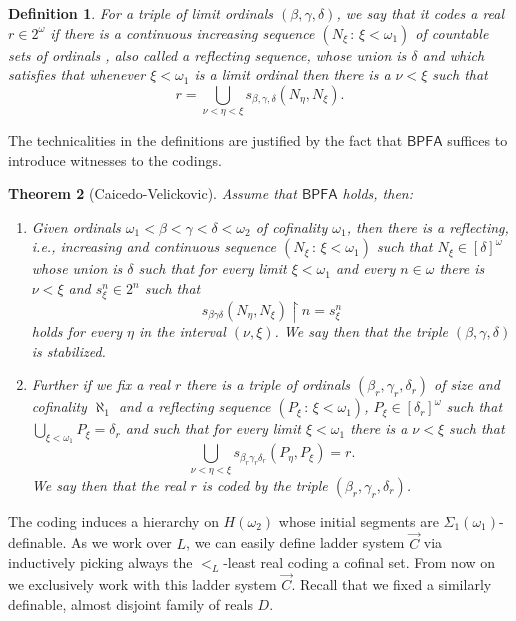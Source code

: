 \documentclass[a4paper,12pt]{article}
\newtheorem{theorem}{Theorem}[section]
\newtheorem{definition}[theorem]{Definition}
\newcommand{\BPFA}{\mathsf{BPFA}}
\begin{document}
\begin{definition}
For a triple of limit ordinals $(\beta, \gamma, \delta)$, we say that it codes a real $r \in 2^{\omega}$
if there is a continuous increasing sequence $(N_{\xi} \, : \, \xi < \omega_1)$ of countable sets of ordinals , also called a reflecting sequence, whose 
union is $\delta$ and which satisfies that whenever $\xi < \omega_1$ is a limit ordinal then there is a $\nu < \xi$ such that
$$ r = \bigcup_{\nu < \eta < \xi} s_{\beta, \gamma, \delta} (N_{\eta}, N_{\xi}). $$
\end{definition}
The technicalities in the definitions are justified by the fact that $\BPFA$ suffices to introduce witnesses to the codings.


\begin{theorem}[Caicedo-Velickovic]
Assume that $\BPFA$ holds, then:

\begin{enumerate}
\item[$(\dagger)$] Given ordinals $\omega_1 < \beta < \gamma < \delta < \omega_2$ of cofinality $\omega_1$,
then
there is a reflecting, i.e.,  increasing and continuous sequence $(N_{\xi} \, : \, \xi < \omega_1)$ such that $N_{\xi} \in [\delta]^{\omega}$ 
whose union is $\delta$ such that for every limit $\xi < \omega_1$ and every $n \in \omega$ there 
is $\nu < \xi$ and $s_{\xi}^n \in 2^n$ such that 
$$s_{\beta \gamma \delta}(N_{\eta}, N_{\xi}) \upharpoonright n = s_{\xi}^{n}$$ holds for every $\eta$ in the interval $(\nu, \xi)$.
We say then that the triple $(\beta, \gamma, \delta)$ is \textit{stabilized}.
 
\item[$(\ddagger)$] Further if we fix a real $r$
there is a triple of ordinals
$(\beta_r, \gamma_r, \delta_r)$ of size and cofinality $\aleph_1$ and a reflecting sequence 
$(P_{\xi} \, : \, \xi < \omega_1)$, $P_{\xi} \in [\delta_r]^{\omega}$ such that $\bigcup_{\xi < \omega_1} P_{\xi} = \delta_r$ 
and such that for every limit $\xi < \omega_1$ there is a $\nu < \xi$ such that 
$$\bigcup_{\nu < \eta < \xi} s_{\beta_r \gamma_r \delta_r} (P_{\eta}, P_{\xi}) = r.$$ 
We say then that the real $r$ is \textit{coded} by the triple $(\beta_r, \gamma_r, \delta_r)$.
\end{enumerate}
\end{theorem}


The coding induces a hierarchy on $H(\omega_2)$ whose initial segments are $\Sigma_1(\omega_1)$-definable. As we work over $L$, we can easily define ladder system $\vec{C}$ via inductively picking always the $<_L$-least real coding a cofinal set. From now on we exclusively work with this ladder system $\vec{C}$. Recall that we fixed a similarly definable, almost disjoint family of reals $D$.
\end{document}
